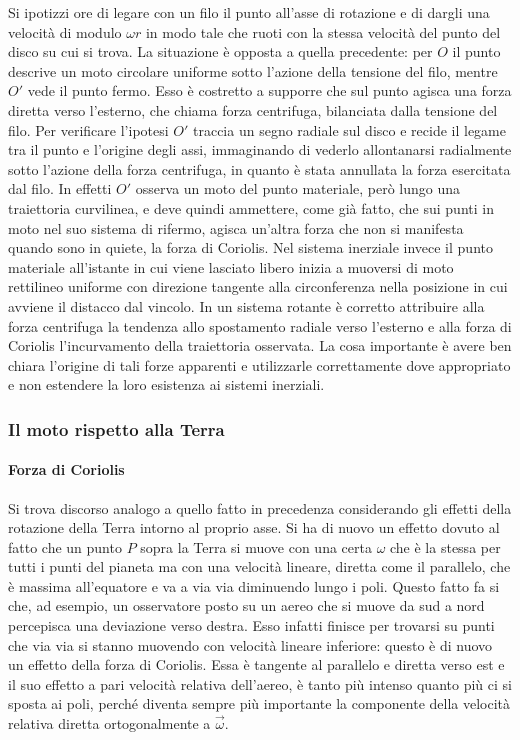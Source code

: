 Si ipotizzi ore di legare con un filo il punto all'asse di rotazione e di dargli una velocità di modulo $\omega r$ in modo tale che ruoti con la stessa velocità del punto del disco su cui si trova. La situazione è opposta a quella precedente: per $O$ il punto descrive un moto circolare uniforme sotto l'azione della tensione del filo, mentre $O'$ vede il punto fermo. Esso è costretto a supporre che sul punto agisca una forza diretta verso l'esterno, che chiama forza centrifuga, bilanciata dalla tensione del filo. Per verificare l'ipotesi $O'$ traccia un segno radiale sul disco e recide il legame tra il punto e l'origine degli assi, immaginando di vederlo allontanarsi radialmente sotto l'azione della forza centrifuga, in quanto è stata annullata la forza esercitata dal filo. In effetti $O'$ osserva un moto del punto materiale, però lungo una traiettoria curvilinea, e deve quindi ammettere, come già fatto, che sui punti in moto nel suo sistema di rifermo, agisca un'altra forza che non si manifesta quando sono in quiete, la forza di Coriolis. Nel sistema inerziale invece il punto materiale all'istante in cui viene lasciato libero inizia a muoversi di moto rettilineo uniforme con direzione tangente alla circonferenza nella posizione in cui avviene il distacco dal vincolo.  In un sistema rotante è corretto attribuire alla forza centrifuga la tendenza allo spostamento radiale verso l'esterno e alla forza di Coriolis l'incurvamento della traiettoria osservata. La cosa importante è avere ben chiara l'origine di tali forze apparenti e utilizzarle correttamente dove appropriato e non estendere la loro esistenza ai sistemi inerziali.

\subsubsection{Il moto rispetto alla Terra}

\paragraph{Forza di Coriolis} Si trova discorso analogo a quello fatto in precedenza considerando gli effetti della rotazione della Terra intorno al proprio asse. Si ha di nuovo un effetto dovuto al fatto che un punto $P$ sopra la Terra si muove con una certa $\omega$ che è la stessa per tutti i punti del pianeta ma con una velocità lineare, diretta come il parallelo, che è massima all'equatore e va a via via diminuendo lungo i poli. Questo fatto fa si che, ad esempio, un osservatore posto su un aereo che si muove da sud a nord percepisca una deviazione verso destra. Esso infatti finisce per trovarsi su punti che via via si stanno muovendo con velocità lineare inferiore: questo è di nuovo un effetto della forza di Coriolis. Essa è tangente al parallelo e diretta verso est e il suo effetto a pari velocità relativa dell'aereo, è tanto più intenso quanto più ci si sposta ai poli, perché diventa sempre più importante la componente della velocità relativa diretta ortogonalmente a $\vec{\omega}$.

